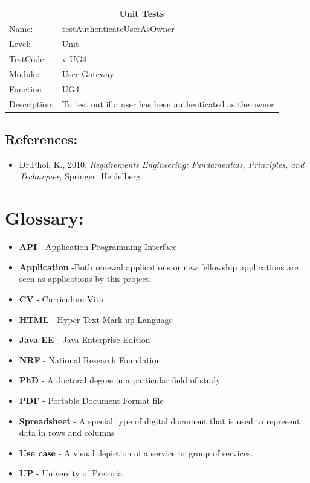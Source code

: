 \documentclass[12pt]{article}
\begin{document}
\begin{center}
\begin{tabular}{|l|p{12cm}|}
\hline
\multicolumn{2}{|c|}{\bf Unit Tests} \\
\hline
 Name: & testAuthenticateUserAsOwner \\
\hline
Level: & Unit \\
\hline
TestCode: & v UG4 \\
\hline
Module:& User Gateway\\
\hline
Function & UG4 \\
\hline
Description: & To test out if a user has been authenticated as the owner \\
\hline

\end{tabular}
\end{center}

\subsection{References:}
\vspace{0.1in}
\begin{itemize}
\item Dr.Phol, K., 2010, \textit{Requirements Engineering: Fundamentals, Principles, and Techniques}, Springer, Heidelberg.
\end{itemize}	

\vspace{0.5in}


\newpage
\section{Glossary:}
\vspace{0.2in}

\begin{itemize}

\item \textbf{API} - Application Programming Interface
\item \textbf{Application} -Both renewal applications or new fellowship applications are seen as applications by this project.
\item \textbf{CV} - Curriculum Vita
\item \textbf{HTML} - Hyper Text Mark-up Language
\item \textbf{Java EE} - Java Enterprise Edition
\item \textbf{NRF} - National Research Foundation
\item \textbf{PhD} - A doctoral degree in a particular field of study.
\item \textbf{PDF} - Portable Document Format file
\item \textbf{Spreadsheet} - A special type of digital document that is used to represent data in rows and columns
\item \textbf{Use case} - A visual depiction of a service or group of services.
\item \textbf{UP} - University of Pretoria
 


\end{itemize}	
\end{document}
